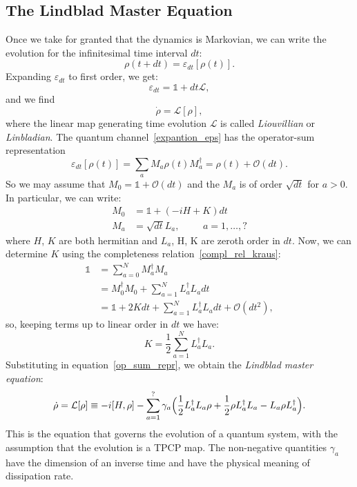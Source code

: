\subsection{The Lindblad Master Equation}
Once we take for granted that the dynamics is Markovian, we can write the evolution for the infinitesimal time interval $dt$:
\begin{equation}
    \rho(t+dt) = \varepsilon_{dt}[\rho(t)].
\end{equation}
Expanding $\varepsilon_{dt}$ to first order, we get:
\begin{equation}
\label{expantion_eps}
    \varepsilon_{dt} = \mathds{1} + dt\mathcal{L},
\end{equation}
and we find
\begin{equation}
    \Dot{\rho} = \mathcal{L}[\rho],
\end{equation}
where the linear map generating time evolution $\mathcal{L}$ is called \emph{Liouvillian} or \emph{Linbladian}. 
The quantum channel~\ref{expantion_eps} has the operator-sum representation
\begin{equation}
\label{op_sum_repr}
    \varepsilon_{dt}[\rho(t)] = \sum_a M_a \rho(t) M_a^\dagger = \rho(t) + \mathcal{O}(dt).
\end{equation}
So we may assume that $M_0 = \mathds{1} + \mathcal{O}(dt)$ and the $M_a$ is of order $\sqrt{dt}$ for $a>0$. In particular, we can write:
\begin{align}
    M_0 &= \mathds{1} + (-iH+K)dt \\
    M_a &= \sqrt{dt}L_a, \hspace{1cm} a = 1,\dots,?
\end{align}
where $H$, $K$ are both hermitian and $L_a$, H, K are zeroth order in $dt$.
Now, we can determine $K$ using the completeness relation~\ref{compl_rel_kraus}:
\begin{align}
    \mathds{1} &= \sum_{a=0}^N M_a^\dagger M_a \\
               &= M_0^\dagger M_0 + \sum_{a=1}^N L_a^\dagger L_a dt \\
               &= \mathds{1} +2Kdt + \sum_{a=1}^N L_a^\dagger L_a dt + \mathcal{O}(dt^2),
\end{align}
so, keeping terms up to linear order in $dt$ we have:
\begin{equation*}
    K = \frac{1}{2} \sum_{a=1}^N L_a^\dagger L_a.
\end{equation*}
Substituting in equation~\ref{op_sum_repr}, we obtain the \emph{Lindblad master equation}:
\begin{equation}
\label{eqn:lindblad_eqn}
    \dot{\rho} = \mathcal{L}[\rho] \equiv -i[H, \rho] - \sum_{a=1}^? \gamma_a \Bigl(\frac{1}{2}L_a^{\dagger}L_a\rho + \frac{1}{2}\rho L_a^{\dagger}L_a - L_a\rho L_a^{\dagger}\Bigl).
\end{equation}
This is the equation that governs the evolution of a quantum system, with the assumption that the evolution is a TPCP map. The non-negative quantities $\gamma_a$ have the dimension of an inverse time and have the physical meaning of dissipation rate.

